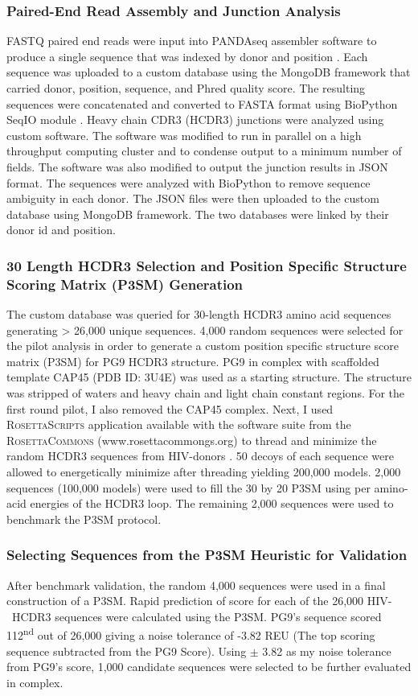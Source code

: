 \subsubsection{Paired-End Read Assembly and Junction Analysis}
FASTQ paired end reads were input into PANDAseq assembler software to produce a single sequence that was indexed by donor and position \citep{Bartram:2011cz}. Each sequence was uploaded to a custom database using the MongoDB framework that carried donor, position, sequence, and Phred quality score. The resulting sequences were concatenated and converted to FASTA format using BioPython SeqIO module \citep{Cock:2009hj}. Heavy chain CDR3 (HCDR3) junctions were analyzed using custom software. The software was modified to run in parallel on a high throughput computing cluster and to condense output to a minimum number of fields. The software was also modified to output the junction results in JSON format. The sequences were analyzed with BioPython to remove sequence ambiguity in each donor. The JSON files were then uploaded to the custom database using MongoDB framework. The two databases were linked by their donor id and position.

\subsubsection{30 Length HCDR3 Selection and Position Specific Structure Scoring Matrix (P3SM) Generation}
The custom database was queried for 30-length HCDR3 amino acid sequences generating > 26,000 unique sequences. 4,000 random sequences were selected for the pilot analysis in order to generate a custom position specific structure score matrix (P3SM) for PG9 HCDR3 structure. PG9 in complex with scaffolded template CAP45 (PDB ID: 3U4E) was used as a starting structure. The structure was stripped of waters and heavy chain and light chain constant regions. For the first round pilot, I also removed the CAP45 complex. Next, I used R\textsc{osetta}S\textsc{cripts} application available with the software suite from the R\textsc{osetta}C\textsc{ommons} (www.rosettacommongs.org) to thread and minimize the random HCDR3 sequences from HIV-\naive donors \citep{Fleishman:2011ji}. 50 decoys of each sequence were allowed to energetically minimize after threading yielding 200,000 models. 2,000 sequences (100,000 models) were used to fill the 30 by 20 P3SM using \rosetta per amino-acid energies of the HCDR3 loop. The remaining 2,000 sequences were used to benchmark the P3SM protocol.

\subsubsection{Selecting Sequences from the P3SM Heuristic for Validation}
After benchmark validation, the random 4,000 sequences were used in a final construction of a P3SM. Rapid prediction of score for each of the 26,000 HIV-\naive~HCDR3 sequences were calculated using the P3SM. PG9's sequence scored 112\textsuperscript{nd} out of 26,000 giving a noise tolerance of -3.82 REU (The top scoring sequence subtracted from the PG9 Score). Using $\pm$ 3.82 as my noise tolerance from PG9's score, 1,000 candidate sequences were selected to be further evaluated in complex.

